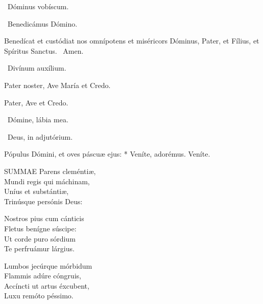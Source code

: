 \V\ Dóminus vobíscum.

\V\ Benedicámus Dómino.

 Benedícat et custódiat nos omnípotens et miséricors Dóminus, Pater, et Fílius, et Spíritus Sanctus. \R\ Amen.


\V\ Divínum auxílium.

Pater noster, Ave María et Credo.



Pater, Ave et Credo.

\V\ Dómine, lábia mea.

\V\ Deus, in adjutórium.


 Pópulus Dómini, et oves páscuæ ejus: * Veníte, adorémus.  Veníte.


\lettrine[lines=2]{S}{UMMAE} Parens cleméntiæ,\\
Mundi regis qui máchinam,\\
Uníus et substántiæ,\\
Trinúsque persónis Deus:

Nostros pius cum cánticis\\
Fletus benígne súscipe:\\
Ut corde puro sórdium\\
Te perfruámur lárgius.

Lumbos jecúrque mórbidum\\
Flammis adúre cóngruis,\\
Accíncti ut artus éxcubent,\\
Luxu remóto péssimo.

